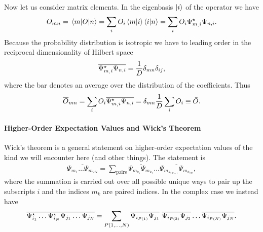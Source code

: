 Now let us consider matrix elements. In the eigenbasis $\ket{i}$ of the operator we have
\begin{align*}
	O_{mn} = \mel{m}{O}{n} = \sum\limits_{i}O_{i}\braket{m}{i}\braket{i}{n} = \sum\limits_{i}O_{i}\Psi_{m_, i}^{\star}\Psi_{n, i}.
\end{align*}
Because the probability distribution is isotropic we have to leading order in the reciprocal dimensionality of Hilbert space
\begin{align*}
	\overline{\Psi_{m_, i}^{\star}\Psi_{n, i}} = \frac{1}{D}\delta_{mn}\delta_{ij},
\end{align*}
where the bar denotes an average over the distribution of the coefficients. Thus
\begin{align*}
	\overline{O}_{mn} = \sum\limits_{i}O_{i}\overline{\Psi_{m_, i}^{\star}\Psi_{n, i}} = \delta_{mn}\frac{1}{D}\sum\limits_{i}O_{i} \equiv \bar{O}.
\end{align*}

\paragraph{Higher-Order Expectation Values and Wick's Theorem}
Wick's theorem is a general statement on higher-order expectation values of the kind we will encounter here (and other things). The statement is
\begin{align*}
	\overline{\Psi_{m_{1}}\dots\Psi_{m_{2N}}} = \sum\limits_{\text{pairs}}\overline{\Psi_{m_{k_{1}}}\Psi_{m_{k_{2}}}}\dots\overline{\Psi_{m_{k_{2N - 1}}}\Psi_{m_{k_{2N}}}},
\end{align*}
where the summation is carried out over all possible unique ways to pair up the subscripts $i$ and the indices $m_{k}$ are paired indices. In the complex case we instead have
\begin{align*}
	\overline{\Psi_{i_{1}}\cc\dots\Psi_{i_{N}}\cc\Psi_{j_{1}}\dots\Psi_{j_{N}}} = \sum\limits_{P(1, \dots, N)}\overline{\Psi_{i_{P(1)}}\Psi_{j_{1}}}\ \overline{\Psi_{i_{P(2)}}\Psi_{j_{2}}}\dots\overline{\Psi_{i_{P(N)}}\Psi_{j_{N}}}.
\end{align*}

